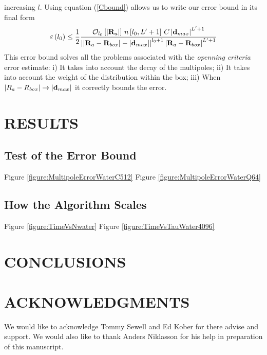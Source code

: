 \documentclass[prb,aps,nobibnotes,superbib,preprint]{revtex4}
\begin{document}
increasing $l$. Using equation (\ref{Cbound}) allows us to write our error bound in its final form
\begin{equation}
\varepsilon \left( l_{0}\right) \leq \frac{1}{2}\frac{{\cal O}_{l_{0}}\left[\left| 
\mathbf{R}_a\right| 
\right] \, n\left[ l_{0},L'+1\right] \, C \left| \mathbf{d}_{max}\right| ^{L'+1}}{
\left| \left| 
\mathbf{R}_a-\mathbf{R}_{box}\right| -\left| \mathbf{d}_{max}\right| \right| ^{l_{0}+1}\left| \mathbf{R}_a-
\mathbf{R}_{box}
\right| ^{L'+1}}
\end{equation}
This error bound solves all the problems associated with the {\it openning criteria} error estimate: 
i) It takes into account the decay of the multipoles; 
ii) It takes into account the weight of the distribution within the box;
iii) When $|R_a - R_{box}| \rightarrow |{\bf d}_{max}|$ it correctly bounds the error.

\section{RESULTS}

\subsection{Test of the Error Bound}

Figure \ref{figure:MultipoleErrorWaterC512}
Figure \ref{figure:MultipoleErrorWaterQ64}

\subsection{How the Algorithm Scales}

Figure \ref{figure:TimeVsNwater}
Figure \ref{figure:TimeVsTauWater4096}

\section{CONCLUSIONS}


\section*{ACKNOWLEDGMENTS}

We would like to acknowledge Tommy Sewell and Ed Kober for there advise
and support. We would also like to thank Anders Niklasson for his help
in preparation of this manuscript. 

 

\end{document}
